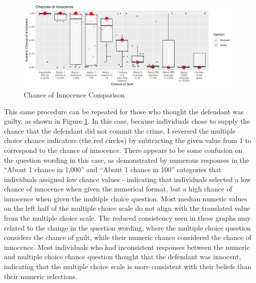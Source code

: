 \documentclass[print]{nuthesis}
\begin{document}
\begin{figure}

{\centering \includegraphics[width=\linewidth]{thesis_files/figure-latex/likecomp2-1} 

}

\caption{Chance of Innocence Comparison}\label{fig:likecomp2}
\end{figure}

This same procedure can be repeated for those who thought the defendant was guilty, as shown in Figure \ref{fig:likecomp2}.
In this case, because individuals chose to supply the chance that the defendant did not commit the crime, I reversed the multiple choice chance indicators (the red circles) by subtracting the given value from 1 to correspond to the chance of innocence.
There appears to be some confusion on the question wording in this case, as demonstrated by numerous responses in the ``About 1 chance in 1,000'' and ``About 1 chance in 100'' categories that individuals assigned low chance values - indicating that individuals selected a low chance of innocence when given the numerical format, but a high chance of innocence when given the multiple choice question.
Most median numeric values on the left half of the multiple choice scale do not align with the translated value from the multiple choice scale.
The reduced consistency seen in these graphs may related to the change in the question wording, where the multiple choice question considers the chance of guilt, while their numeric chance considered the chance of innocence.
Most individuals who had inconsistent responses between the numeric and multiple choice chance question thought that the defendant was innocent, indicating that the multiple choice scale is more consistent with their beliefs than their numeric selections.
\end{document}
